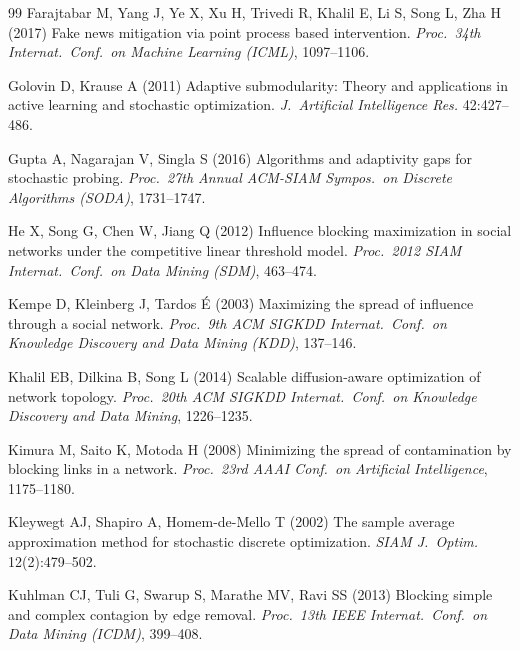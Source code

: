 \documentclass[11pt]{article}
\theoremstyle{definition}
\theoremstyle{remark}
\begin{document}
\begin{thebibliography}{99}
Farajtabar M, Yang J, Ye X, Xu H, Trivedi R, Khalil E, Li S, Song L, Zha H
  (2017) Fake news mitigation via point process based intervention.
  \emph{Proc.\ 34th Internat.\ Conf.\ on Machine Learning (ICML)},
  1097--1106.

Golovin D, Krause A (2011) Adaptive submodularity: Theory and applications
  in active learning and stochastic optimization. \emph{J.\ Artificial
  Intelligence Res.} 42:427--486.

Gupta A, Nagarajan V, Singla S (2016) Algorithms and adaptivity gaps for
  stochastic probing. \emph{Proc.\ 27th Annual ACM-SIAM Sympos.\ on Discrete
  Algorithms (SODA)}, 1731--1747.

He X, Song G, Chen W, Jiang Q (2012) Influence blocking maximization in
  social networks under the competitive linear threshold model.
  \emph{Proc.\ 2012 SIAM Internat.\ Conf.\ on Data Mining (SDM)}, 463--474.

Kempe D, Kleinberg J, Tardos {\'E} (2003) Maximizing the spread of influence
  through a social network. \emph{Proc.\ 9th ACM SIGKDD Internat.\ Conf.\ on
  Knowledge Discovery and Data Mining (KDD)}, 137--146.

Khalil EB, Dilkina B, Song L (2014) Scalable diffusion-aware optimization of
  network topology. \emph{Proc.\ 20th ACM SIGKDD Internat.\ Conf.\ on Knowledge
  Discovery and Data Mining}, 1226--1235.

Kimura M, Saito K, Motoda H (2008) Minimizing the spread of contamination by
  blocking links in a network. \emph{Proc.\ 23rd AAAI Conf.\ on Artificial
  Intelligence}, 1175--1180.

Kleywegt AJ, Shapiro A, Homem-de-Mello T (2002) The sample average
  approximation method for stochastic discrete optimization. \emph{SIAM J.\
  Optim.} 12(2):479--502.

Kuhlman CJ, Tuli G, Swarup S, Marathe MV, Ravi SS (2013) Blocking simple and
  complex contagion by edge removal. \emph{Proc.\ 13th IEEE Internat.\ Conf.\
  on Data Mining (ICDM)}, 399--408.


\end{thebibliography}
\end{document}
